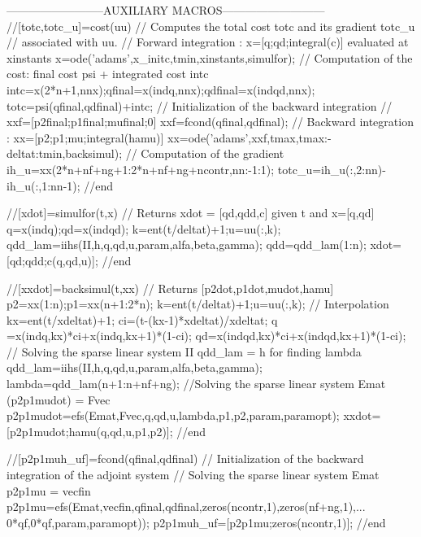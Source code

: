 
 --------------------------AUXILIARY MACROS---------------------------
//[totc,totc_u]=cost(uu)
// Computes the total cost totc and its gradient totc_u 
// associated with uu.
// Forward integration : x=[q;qd;integral(c)] evaluated at xinstants 
x=ode('adams',x_initc,tmin,xinstants,simulfor);
// Computation of the cost: final cost psi + integrated cost intc
intc=x(2*n+1,nnx);qfinal=x(indq,nnx);qdfinal=x(indqd,nnx);
totc=psi(qfinal,qdfinal)+intc;
// Initialization of the backward integration 
//        xxf=[p2final;p1final;mufinal;0]
xxf=fcond(qfinal,qdfinal);
// Backward integration : xx=[p2;p1;mu;integral(hamu)]
xx=ode('adams',xxf,tmax,tmax:-deltat:tmin,backsimul);
// Computation of the gradient
ih_u=xx(2*n+nf+ng+1:2*n+nf+ng+ncontr,nn:-1:1);
totc_u=ih_u(:,2:nn)-ih_u(:,1:nn-1);
//end
 
//[xdot]=simulfor(t,x)
// Returns xdot = [qd,qdd,c] given t and x=[q,qd] 
q=x(indq);qd=x(indqd);
k=ent(t/deltat)+1;u=uu(:,k);
qdd_lam=iihs(II,h,q,qd,u,param,alfa,beta,gamma);
qdd=qdd_lam(1:n);
xdot=[qd;qdd;c(q,qd,u)];
//end

//[xxdot]=backsimul(t,xx)
// Returns [p2dot,p1dot,mudot,hamu] 
p2=xx(1:n);p1=xx(n+1:2*n);
k=ent(t/deltat)+1;u=uu(:,k);
// Interpolation
kx=ent(t/xdeltat)+1;
ci=(t-(kx-1)*xdeltat)/xdeltat;
q =x(indq,kx)*ci+x(indq,kx+1)*(1-ci);
qd=x(indqd,kx)*ci+x(indqd,kx+1)*(1-ci);
// Solving the sparse linear system II qdd_lam = h for finding lambda
qdd_lam=iihs(II,h,q,qd,u,param,alfa,beta,gamma);
lambda=qdd_lam(n+1:n+nf+ng);
//Solving the sparse linear system Emat (p2p1mudot) = Fvec
p2p1mudot=efs(Emat,Fvec,q,qd,u,lambda,p1,p2,param,paramopt);
xxdot=[p2p1mudot;hamu(q,qd,u,p1,p2)];
//end

//[p2p1muh_uf]=fcond(qfinal,qdfinal)
// Initialization of the backward integration of the adjoint system
// Solving the sparse linear system Emat p2p1mu = vecfin
p2p1mu=efs(Emat,vecfin,qfinal,qdfinal,zeros(ncontr,1),zeros(nf+ng,1),...
           0*qf,0*qf,param,paramopt));
p2p1muh_uf=[p2p1mu;zeros(ncontr,1)];
//end
